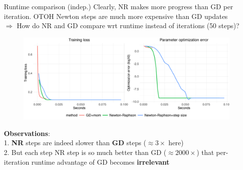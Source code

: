 \documentclass[11pt,compress,t,notes=noshow, xcolor=table]{beamer}
\begin{document}
\begin{vbframe}{Runtime comparison (indep.)}
\vspace{-0.2cm}
{\small Clearly, NR makes more progress than GD per iteration. OTOH Newton steps are much more expensive than GD updates\\
$\Rightarrow$ How do NR and GD compare wrt runtime instead of iterations (50 steps)?}
\begin{figure}
            \includegraphics[width=1.0\textwidth]{figure_man/simu-newton/NR_GD_runtime_comparison.pdf} \\
\end{figure} 
\vspace{-0.3cm}
\textbf{Observations}:\\ 1. \textbf{NR} steps are indeed slower than \textbf{GD} steps ($\approx 3\times$ here)\\
2. But each step NR step is so much better than GD ($\approx 2000 \times$) that per-iteration runtime advantage of GD becomes \textbf{irrelevant}\\
\end{vbframe}
\end{document}
